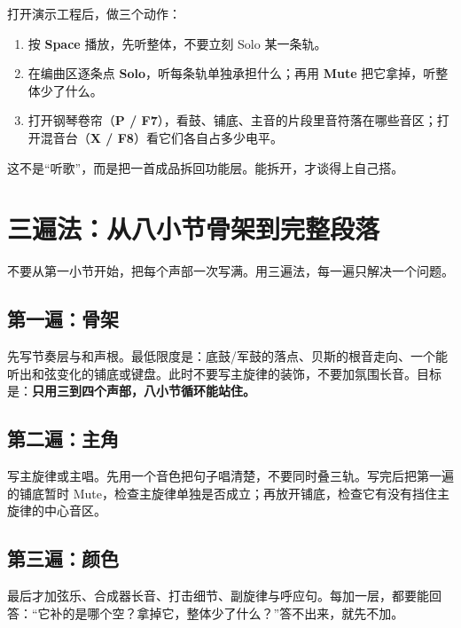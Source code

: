 打开演示工程后，做三个动作：

\begin{enumerate}
\item 按 \textbf{Space} 播放，先听整体，不要立刻 Solo 某一条轨。
\item 在编曲区逐条点 \textbf{Solo}，听每条轨单独承担什么；再用 \textbf{Mute} 把它拿掉，听整体少了什么。
\item 打开钢琴卷帘（\textbf{P / F7}），看鼓、铺底、主音的片段里音符落在哪些音区；打开混音台（\textbf{X / F8}）看它们各自占多少电平。
\end{enumerate}

这不是“听歌”，而是把一首成品拆回功能层。能拆开，才谈得上自己搭。


\section{三遍法：从八小节骨架到完整段落}
\label{sec:three-pass}

不要从第一小节开始，把每个声部一次写满。用三遍法，每一遍只解决一个问题。

\subsection*{第一遍：骨架}
先写节奏层与和声根。最低限度是：底鼓/军鼓的落点、贝斯的根音走向、一个能听出和弦变化的铺底或键盘。此时不要写主旋律的装饰，不要加氛围长音。目标是：\textbf{只用三到四个声部，八小节循环能站住。}

\subsection*{第二遍：主角}
写主旋律或主唱。先用一个音色把句子唱清楚，不要同时叠三轨。写完后把第一遍的铺底暂时 Mute，检查主旋律单独是否成立；再放开铺底，检查它有没有挡住主旋律的中心音区。

\subsection*{第三遍：颜色}
最后才加弦乐、合成器长音、打击细节、副旋律与呼应句。每加一层，都要能回答：“它补的是哪个空？拿掉它，整体少了什么？”答不出来，就先不加。

